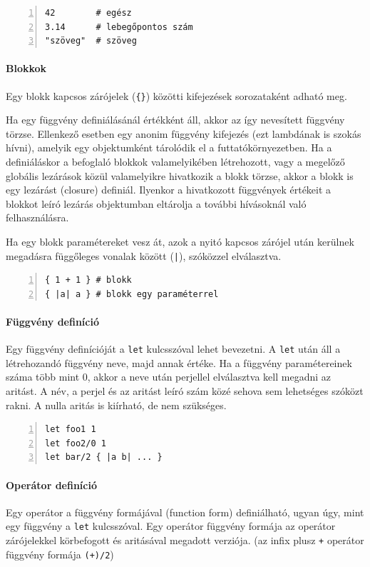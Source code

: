 \begin{lstlisting}[numbers=left]
42        # egész
3.14      # lebegőpontos szám
"szöveg"  # szöveg
\end{lstlisting}

\paragraph{Blokkok} Egy blokk kapcsos zárójelek ({\tt \{\}}) közötti kifejezések sorozataként adható meg.

Ha egy függvény definiálásánál értékként áll, akkor az így nevesített függvény törzse.
Ellenkező esetben egy anonim függvény kifejezés (ezt lambdának is szokás hívni), amelyik egy objektumként tárolódik el a futtatókörnyezetben.
Ha a definiáláskor a befoglaló blokkok valamelyikében létrehozott, vagy a megelőző globális lezárások közül valamelyikre hivatkozik a blokk törzse, akkor a blokk is egy lezárást (closure) definiál.
Ilyenkor a hivatkozott függvények értékeit a blokkot leíró lezárás objektumban eltárolja a további hívásoknál való felhasználásra.

Ha egy blokk paramétereket vesz át, azok a nyitó kapcsos zárójel után kerülnek megadásra függőleges vonalak között ({\tt |}), szóközzel elválasztva.

\begin{lstlisting}[numbers=left]
{ 1 + 1 } # blokk
{ |a| a } # blokk egy paraméterrel
\end{lstlisting}

\paragraph{Függvény definíció} Egy függvény definícióját a {\tt let} kulcsszóval lehet bevezetni. A {\tt let} után áll a létrehozandó függvény neve, majd annak értéke.
Ha a függvény paramétereinek száma több mint 0, akkor a neve után perjellel elválasztva kell megadni az aritást.
A név, a perjel és az aritást leíró szám közé sehova sem lehetséges szóközt rakni.
A nulla aritás is kiírható, de nem szükséges.

\begin{lstlisting}[numbers=left]
let foo1 1
let foo2/0 1
let bar/2 { |a b| ... }
\end{lstlisting}

\paragraph{Operátor definíció} Egy operátor a függvény formájával (function form) definiálható, ugyan úgy, mint egy függvény a {\tt let} kulcsszóval.
Egy operátor függvény formája az operátor zárójelekkel körbefogott és aritásával megadott verziója. (\pl az infix plusz {\tt +} operátor függvény formája {\tt (+)/2})


